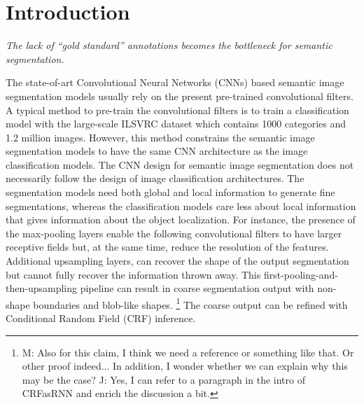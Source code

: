 \section{Introduction}
\label{introduction}

\noindent
\textit{The lack of ``gold standard'' annotations becomes the bottleneck for semantic segmentation.}

\noindent
The state-of-art Convolutional Neural Networks (CNNs) based semantic image segmentation models usually rely on the present pre-trained convolutional filters. \cite{long2015fully}
A typical method to pre-train the convolutional filters is to train a classification model with the large-scale ILSVRC dataset \cite{russakovsky2015imagenet} which contains 1000 categories and 1.2 million images.
However, this method constrains the semantic image segmentation models to have the same CNN architecture as the image classification models.
The CNN design for semantic image segmentation does not necessarily follow the design of image classification architectures.
The segmentation models need both global and local information to generate fine segmentations, whereas the classification models care less about local information that gives information about the object localization.
For instance, the presence of the max-pooling layers enable the following convolutional filters to have larger receptive fields but, at the same time, reduce the resolution of the features.
Additional upsampling layers, can recover the shape of the output segmentation but cannot fully recover the information thrown away.
This first-pooling-and-then-upsampling pipeline can result in coarse segmentation output \cite{chen2016deeplab} with non-shape boundaries and blob-like shapes.
\footnote{M: Also for this claim, I think we need a reference or something like that.  Or other proof indeed...  In addition, I wonder whether we can explain why this may be the case? J: Yes, I can refer to a paragraph in the intro of CRFasRNN and enrich the discussion a bit.}
The coarse output can be refined with Conditional Random Field (CRF) inference\cite{zheng2015conditional,chen2016deeplab}.

